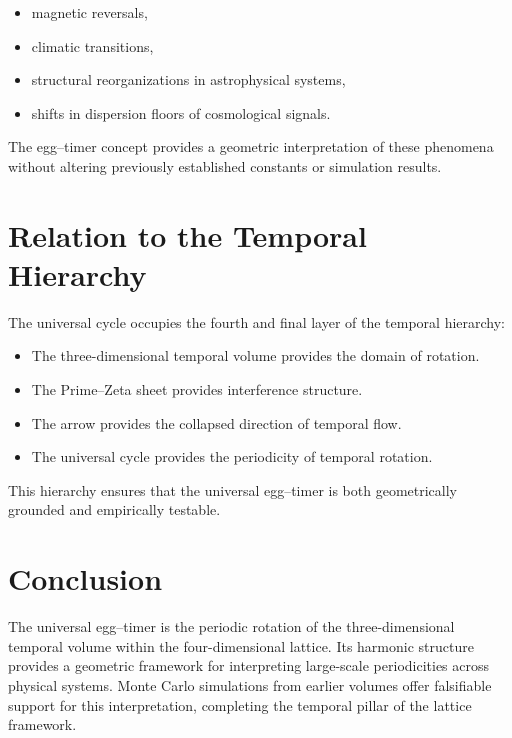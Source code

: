 \documentclass[11pt, letterpaper, openany]{book}
\begin{document}
\begin{itemize}
    \item magnetic reversals,
    \item climatic transitions,
    \item structural reorganizations in astrophysical systems,
    \item shifts in dispersion floors of cosmological signals.
\end{itemize}

The egg--timer concept provides a geometric interpretation of these 
phenomena without altering previously established constants or simulation 
results.

\section{Relation to the Temporal Hierarchy}

The universal cycle occupies the fourth and final layer of the temporal 
hierarchy:

\begin{itemize}
    \item The three-dimensional temporal volume provides the domain of rotation.
    \item The Prime--Zeta sheet provides interference structure.
    \item The arrow provides the collapsed direction of temporal flow.
    \item The universal cycle provides the periodicity of temporal rotation.
\end{itemize}

This hierarchy ensures that the universal egg--timer is both geometrically 
grounded and empirically testable.

\section{Conclusion}
The universal egg--timer is the periodic rotation of the three-dimensional 
temporal volume within the four-dimensional lattice. 
Its harmonic structure provides a geometric framework for interpreting 
large-scale periodicities across physical systems. 
Monte Carlo simulations from earlier volumes offer falsifiable support for 
this interpretation, completing the temporal pillar of the lattice framework.

\end{document}
